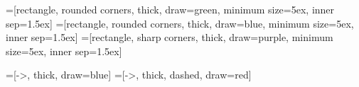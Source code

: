 
=[rectangle, rounded corners, thick, draw=green,
  minimum size=5ex, inner sep=1.5ex]
=[rectangle, rounded corners, thick, draw=blue,
  minimum size=5ex, inner sep=1.5ex]
=[rectangle, sharp corners, thick, draw=purple,
  minimum size=5ex, inner sep=1.5ex]

=[->, thick, draw=blue]
=[->, thick, dashed, draw=red]
